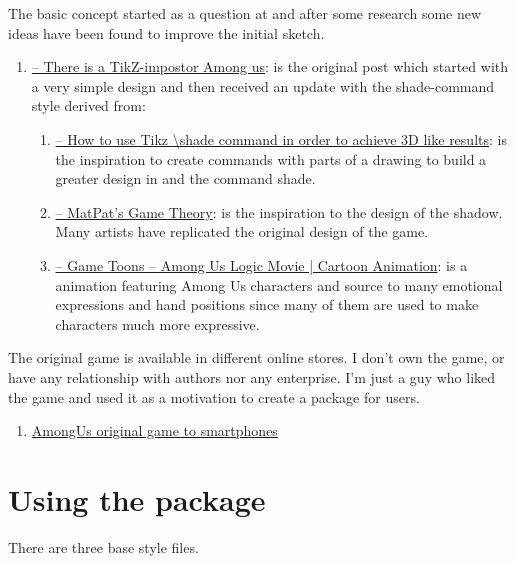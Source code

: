 \documentclass[12pt]{article}
\newenvironment{FHZtcbEnumerate}{%
  \begin{FHZboxEnumerateStyle}\begin{enumerate}}
    {\end{enumerate}\end{FHZboxEnumerateStyle}
}
\begin{document}
The basic concept started as a question at {\TeXStackExchange} and after some research some new ideas have been found to improve the initial sketch.
\begin{FHZtcbEnumerate}
  \item \href{https://tex.stackexchange.com/questions/567009/there-is-a-tikz-impostor-among-us/567010#567010}{{\TeXStackExchange} -- There is a TikZ-impostor Among us}: is the original post which started with a very simple design and then received an update with the shade-command style derived from:
  \begin{enumerate}
    \item \href{https://tex.stackexchange.com/questions/424113/how-to-use-tikz-shade-command-in-order-to-achieve-3d-like-results}{{\TeXStackExchange} -- How to use Tikz {\textbackslash}shade command in order to achieve 3D like results}: is the inspiration to create commands with parts of a drawing to build a greater design in {\TikZ} and the command shade.
    \item \href{https://youtu.be/1zZZBB9-Nm8}{{\YouTube} -- MatPat's Game Theory}: is the inspiration to the design of the shadow. Many artists have replicated the original design of the game.
    \item \href{https://youtu.be/yZrhRKyFP-U}{{\YouTube} -- Game Toons -- Among Us Logic Movie | Cartoon Animation}: is a animation featuring Among Us characters and source to many emotional expressions and hand positions since many of them are used to make characters much more expressive.
  \end{enumerate}
\end{FHZtcbEnumerate}

The original game is available in different online stores. I don't own the game, or have any relationship with authors nor any enterprise. I'm just a guy who liked the game and used it as a motivation to create a package for {\TikZ} users.
\begin{FHZtcbEnumerate}
  \item \href{https://play.google.com/store/apps/details?id=com.innersloth.spacemafia&hl=pt_BR&gl=US}{AmongUs original game to smartphones}
\end{FHZtcbEnumerate}

\section{Using the package}

There are three base style files.
\begin{FHZtcbAmongUs}
\usepackage{tikz-among-us}
\usepackage{tikz-among-us-fancyhdr}
\usepackage{tikz-among-us-watermark-eso-pic}
\end{FHZtcbAmongUs}
\end{document}
